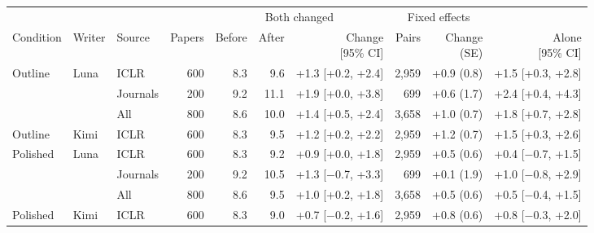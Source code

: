 \begin{tabular}{lllrrrrrrr}
\toprule
 & & & & \multicolumn{3}{c}{Both changed} & \multicolumn{2}{c}{Fixed effects} & \\
\cmidrule(lr){5-7}\cmidrule(lr){8-9}
Condition & Writer & Source & Papers & Before & After & \shortstack{Change\\{[95\% CI]}} & Pairs & \shortstack{Change\\(SE)} & \shortstack{Alone\\{[95\% CI]}} \\
\midrule
Outline & Luna & ICLR & 600 & 8.3 & 9.6 & +1.3 [+0.2, +2.4] & 2,959 & +0.9 (0.8) & +1.5 [+0.3, +2.8] \\
 &  & Journals & 200 & 9.2 & 11.1 & +1.9 [+0.0, +3.8] & 699 & +0.6 (1.7) & +2.4 [+0.4, +4.3] \\
 &  & All & 800 & 8.6 & 10.0 & +1.4 [+0.5, +2.4] & 3,658 & +1.0 (0.7) & +1.8 [+0.7, +2.8] \\
\midrule
Outline & Kimi & ICLR & 600 & 8.3 & 9.5 & +1.2 [+0.2, +2.2] & 2,959 & +1.2 (0.7) & +1.5 [+0.3, +2.6] \\
\midrule
Polished & Luna & ICLR & 600 & 8.3 & 9.2 & +0.9 [+0.0, +1.8] & 2,959 & +0.5 (0.6) & +0.4 [$-$0.7, +1.5] \\
 &  & Journals & 200 & 9.2 & 10.5 & +1.3 [$-$0.7, +3.3] & 699 & +0.1 (1.9) & +1.0 [$-$0.8, +2.9] \\
 &  & All & 800 & 8.6 & 9.5 & +1.0 [+0.2, +1.8] & 3,658 & +0.5 (0.6) & +0.5 [$-$0.4, +1.5] \\
\midrule
Polished & Kimi & ICLR & 600 & 8.3 & 9.0 & +0.7 [$-$0.2, +1.6] & 2,959 & +0.8 (0.6) & +0.8 [$-$0.3, +2.0] \\
\bottomrule
\end{tabular}
